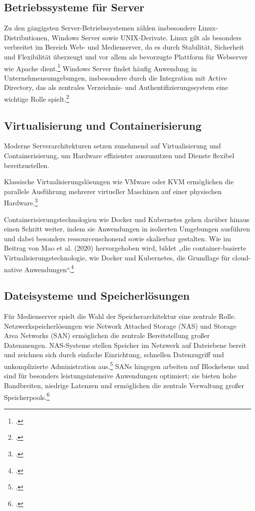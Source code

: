 \documentclass[12pt,a4paper]{report}
\begin{document}
  \subsection{Betriebssysteme für Server}
  Zu den gängigsten Server-Betriebssystemen zählen insbesondere 
  Linux-Distributionen, Windows Server sowie UNIX-Derivate.
  Linux gilt als besonders verbreitet im Bereich Web- und Medienserver, 
  da es durch Stabilität, Sicherheit und Flexibilität überzeugt und 
  vor allem als bevorzugte Plattform für Webserver wie Apache dient.\footcite[Vgl.][S.~963~ff.]{nemeth_unixlinux} 
  Windows Server findet häufig Anwendung in Unternehmensumgebungen, 
  insbesondere durch die Integration mit Active Directory, 
  das als zentrales Verzeichnis- und Authentifizierungssystem eine 
  wichtige Rolle spielt.\footcite[Vgl.][S.~1154~f.]{nemeth_unixlinux}

  \subsection{Virtualisierung und Containerisierung}
  Moderne Serverarchitekturen setzen zunehmend auf Virtualisierung und Containerisierung, 
  um Hardware effizienter auszunutzen und Dienste flexibel bereitzustellen. 

  Klassische Virtualisierungslösungen wie VMware oder KVM ermöglichen die parallele Ausführung mehrerer 
  virtueller Maschinen auf einer physischen Hardware.\footcite[Vgl.][S.~1005, S.~995~f.]{nemeth_unixlinux} 

  Containerisierungstechnologien wie Docker und Kubernetes gehen darüber hinaus einen Schritt weiter, 
  indem sie Anwendungen in isolierten Umgebungen ausführen und dabei besonders ressourcenschonend sowie 
  skalierbar gestalten. Wie im Beitrag von Mao et al. (2020) hervorgehoben wird, 
  bildet „die container-basierte Virtualisierungstechnologie, 
  wie Docker und Kubernetes, die Grundlage für cloud-native Anwendungen“.\footcite{mao2020containers}

\subsection{Dateisysteme und Speicherlösungen}
Für Medienserver spielt die Wahl der Speicherarchitektur eine zentrale Rolle. 
Netzwerkspeicherlösungen wie Network Attached Storage (NAS) und Storage Area Networks (SAN) 
ermöglichen die zentrale Bereitstellung großer Datenmengen. 
NAS-Systeme stellen Speicher im Netzwerk auf Dateiebene bereit und zeichnen sich durch einfache Einrichtung, 
schnellen Datenzugriff und unkomplizierte Administration aus.\footcite[Vgl.][S.~21857]{saravanamuthu2014study} 
SANs hingegen arbeiten auf Blockebene und sind für besonders leistungsintensive Anwendungen optimiert; 
sie bieten hohe Bandbreiten, niedrige Latenzen und ermöglichen die zentrale Verwaltung großer Speicherpools.\footcite[Vgl.][S.~21858~f.]{saravanamuthu2014study}  
\end{document}

